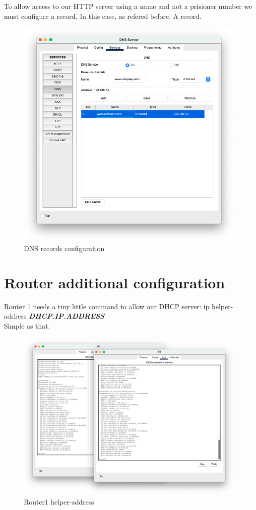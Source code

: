 \documentclass[11pt,a4paper]{report}
\begin{document}
        To allow access to our HTTP server using a name and not a prisioner number we must configure a record. In this case, as refered before, A record.
        \begin{figure}[h]
            \centering
            \includegraphics[scale=0.35]{DNS-Record}
            \caption{DNS records configuration}
            \label{tab:dnsconf}
        \end{figure}

    \section{Router additional configuration}
        Router 1 needs a tiny little command to allow our DHCP server: ip helper-address \textbf{\textit{DHCP.IP.ADDRESS}}\\
        Simple as that.
        \begin{figure}[h]
            \centering
            \includegraphics[scale=0.40]{R1}
            \caption{Router1 helper-address}
            \label{tab:router1}
        \end{figure}
\end{document}
